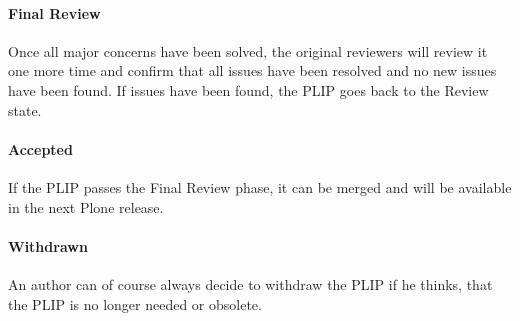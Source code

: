 \paragraph{Final Review}

Once all major concerns have been solved, the original reviewers will review it
one more time and confirm that all issues have been resolved and no new issues
have been found. If issues have been found, the \ac{PLIP} goes back to the
Review state.

\paragraph{Accepted}

If the \ac{PLIP} passes the Final Review phase, it can be merged and will be
available in the next Plone release.

\paragraph{Withdrawn}

An author can of course always decide to withdraw the \ac{PLIP} if he thinks,
that the \ac{PLIP} is no longer needed or obsolete.


